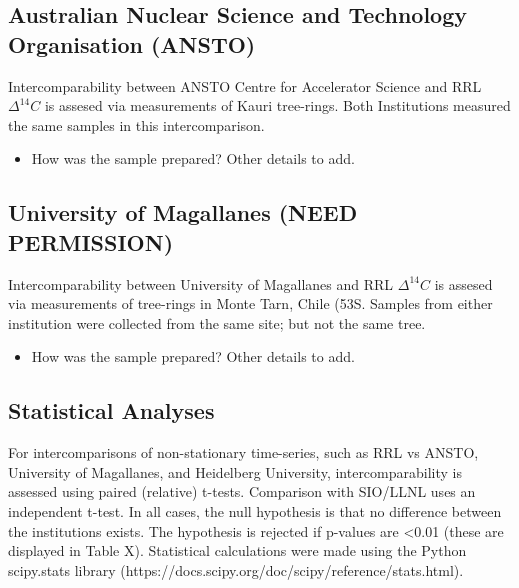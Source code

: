 \documentclass{article}
\begin{document}
\subsection{Australian Nuclear Science and Technology Organisation (ANSTO)}

Intercomparability between ANSTO Centre for Accelerator Science and RRL ${\Delta^{14}C}$ is assesed via measurements of Kauri tree-rings. Both Institutions measured the same samples in this intercomparison.   
\begin{itemize}
	\item How was the sample prepared? Other details to add. 
\end{itemize}

\subsection{University of Magallanes (NEED PERMISSION)}
  
Intercomparability between University of Magallanes and RRL ${\Delta^{14}C}$ is assesed via measurements of tree-rings in Monte Tarn, Chile (53S. Samples from either institution were collected from the same site; but not the same tree. 
\begin{itemize}
	\item How was the sample prepared? Other details to add. 
\end{itemize}


\subsection{Statistical Analyses}
For intercomparisons of non-stationary time-series, such as RRL vs ANSTO, University of Magallanes, and Heidelberg University, intercomparability is assessed using paired (relative) t-tests. Comparison with SIO/LLNL uses an independent t-test. In all cases, the null hypothesis is that no difference between the institutions exists. The hypothesis is rejected if p-values are <0.01 (these are displayed in Table X). Statistical calculations were made using the Python scipy.stats library (https://docs.scipy.org/doc/scipy/reference/stats.html).
\end{document}
